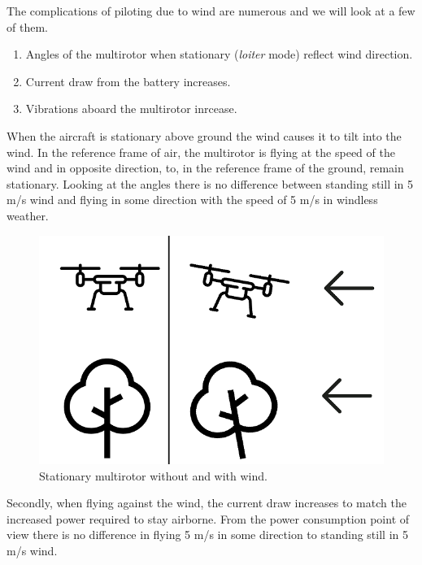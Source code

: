 \documentclass[12pt,oneside]{reedthesis}
\theoremstyle{definition}
\theoremstyle{definition}
\theoremstyle{definition}
\theoremstyle{remark}
\begin{document}
The complications of piloting due to wind are numerous and we will look
at a few of them.
\begin{enumerate}
\def\labelenumi{\arabic{enumi}.}
\item
  Angles of the multirotor when stationary (\emph{loiter} mode) reflect
  wind direction.
\item
  Current draw from the battery increases.
\item
  Vibrations aboard the multirotor inrcease.
\end{enumerate}
When the aircraft is stationary above ground the wind causes it to tilt
into the wind. In the reference frame of air, the multirotor is flying
at the speed of the wind and in opposite direction, to, in the reference
frame of the ground, remain stationary. Looking at the angles there is
no difference between standing still in 5 m/s wind and flying in some
direction with the speed of 5 m/s in windless weather.
\begin{figure}
\centering
\includegraphics{./figure/wind.PNG}
\caption[\label{fig:wind}Stationary multirotor without and with
wind.]{\label{fig:wind}Stationary multirotor without and with
wind.\footnotemark{}}
\end{figure}

Secondly, when flying against the wind, the current draw increases to
match the increased power required to stay airborne. From the power
consumption point of view there is no difference in flying 5 m/s in some
direction to standing still in 5 m/s wind.
\end{document}
